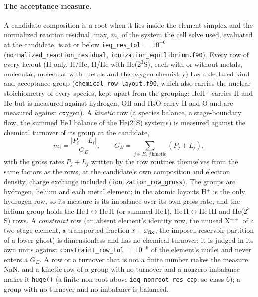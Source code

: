 \paragraph{The acceptance measure.} A candidate composition is a root when it
lies inside the element simplex and the normalized reaction residual
$\max_i m_i$ of the system the cell solve used, evaluated at the candidate,
is at or below \texttt{ieq\_res\_tol} $=10^{-6}$
(\texttt{normalized\_reaction\_residual}, \texttt{ionization\_equilibrium.f90}).
Every row of every layout (H only, H/He, H/He with He($2^3$S), each with or
without metals, molecular, molecular with metals and the oxygen chemistry) has
a declared kind and acceptance group (\texttt{chemical\_row\_layout.f90}, which
also carries the nuclear stoichiometry of every species, kept apart from the
grouping: HeH$^+$ carries H and He but is measured against hydrogen, OH and
H$_2$O carry H and O and are measured against oxygen). A \emph{kinetic} row
(a species balance, a stage-boundary flow, the summed He\,I balance of the
He($2^3$S) systems) is measured against the chemical turnover of its group at
the candidate,
\begin{equation}
m_i = \frac{|P_i - L_i|}{G_E},\qquad G_E = \sum_{j\in E,\ j\ \mathrm{kinetic}} (P_j + L_j),
\label{eq:ion:acceptance}
\end{equation}
with the gross rates $P_j+L_j$ written by the row routines themselves from the
same factors as the rows, at the candidate's own composition and electron
density, charge exchange included (\texttt{ionization\_row\_gross}). The
groups are hydrogen, helium and each metal element; in the atomic layouts H$^+$
is the only hydrogen row, so its measure is its imbalance over its own gross
rate, and the helium group holds the He\,I$\leftrightarrow$He\,II (or summed
He\,I), He\,II$\leftrightarrow$He\,III and He($2^3$S) rows. A
\emph{constraint} row (an absent element's identity row, the unused X$^{++}$
of a two-stage element, a transported fraction $x-x_{\rm fix}$, the imposed
reservoir partition of a lower ghost) is dimensionless and has no chemical
turnover: it is judged in its own units against \texttt{constraint\_row\_tol}
$=10^{-6}$ of the element's nuclei and never enters a $G_E$. A row or a
turnover that is not a finite number makes the measure NaN, and a kinetic row
of a group with no turnover and a nonzero imbalance makes it \texttt{huge()}
(a finite non-root above \texttt{ieq\_nonroot\_res\_cap}, so class 6); a group
with no turnover and no imbalance is balanced.

